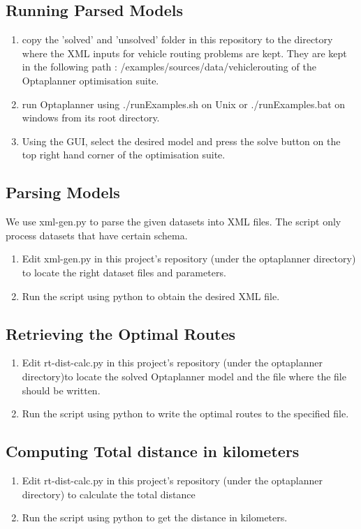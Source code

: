 \subsection{Running Parsed Models}
\begin{enumerate}
    \item copy the 'solved' and 'unsolved' folder in this repository to the directory where the XML inputs for vehicle
    routing problems are kept. They are kept in the following path : /examples/sources/data/vehiclerouting of
    the Optaplanner optimisation suite.
    \item run Optaplanner using ./runExamples.sh on Unix or ./runExamples.bat on windows from its root directory.
    \item Using the GUI, select the desired model and press the solve button on the top right hand corner of the optimisation suite.
\end{enumerate}

\subsection{Parsing Models}
We use xml-gen.py to parse the given datasets into XML files. The script only process datasets that have certain schema.
\begin{enumerate}
    \item Edit xml-gen.py in this project's repository (under the optaplanner directory) to locate the right dataset files
    and parameters.
    \item Run the script using python to obtain the desired XML file.
\end{enumerate}

\subsection{Retrieving the Optimal Routes}
\begin{enumerate}
    \item Edit rt-dist-calc.py in this project's repository (under the optaplanner directory)to locate the solved Optaplanner model and
    the file where the file should be written.
    \item Run the script using python to write the optimal routes to the specified file.
\end{enumerate}

\subsection{Computing Total distance in kilometers}
\begin{enumerate}
    \item Edit rt-dist-calc.py in this project's repository (under the optaplanner directory) to calculate the total distance
    \item Run the script using python to get the distance in kilometers.
\end{enumerate}



